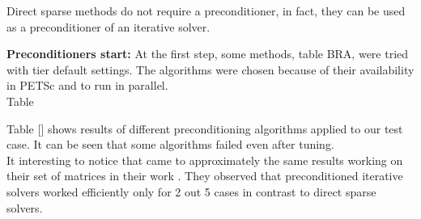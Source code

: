 \label{subseq:hybrid-method-description}



Direct sparse methods do not require a preconditioner, in fact, they can be used as a preconditioner of an iterative solver.\\








\textbf{Preconditioners start:}
At the first step, some methods, table BRA, were tried with tier default settings. The algorithms were chosen because of their availability in PETSc and to run in parallel.\\





Table 

Table [] shows results of different preconditioning algorithms applied to our test case. It can be seen that some algorithms failed even after tuning. \\

It interesting to notice that \citeauthor{wsmp} came to approximately the same results working on their set of matrices in their work \cite{wsmp}. They observed that preconditioned iterative solvers worked efficiently only for 2 out 5 cases in contrast to direct sparse solvers.\\

